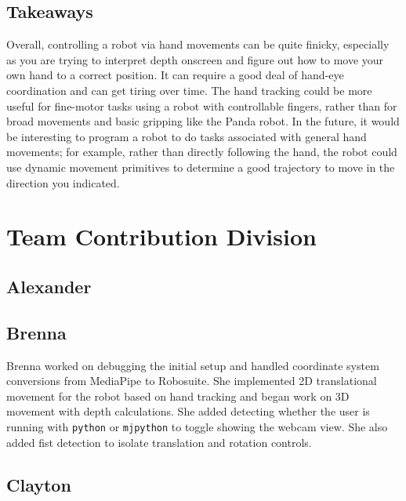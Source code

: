\documentclass{article}
\begin{document}
\subsection{Takeaways}Overall, controlling a robot via hand movements can be quite finicky, especially as you are trying to interpret depth onscreen and figure out how to move your own hand to a correct position. It can require a good deal of hand-eye coordination and can get tiring over time. The hand tracking could be more useful for fine-motor tasks using a robot with controllable fingers, rather than for broad movements and basic gripping like the Panda robot. In the future, it would be interesting to program a robot to do tasks associated with general hand movements; for example, rather than directly following the hand, the robot could use dynamic movement primitives to determine a good trajectory to move in the direction you indicated. 


\section{Team Contribution Division}
\subsection*{Alexander}
\subsection*{Brenna}
Brenna worked on debugging the initial setup and handled coordinate system conversions from MediaPipe to Robosuite. She implemented 2D translational movement for the robot based on hand tracking and began work on 3D movement with depth calculations. She added detecting whether the user is running with \texttt{python} or \texttt{mjpython} to toggle showing the webcam view. She also added fist detection to isolate translation and rotation controls. 
\subsection*{Clayton}


\clearpage


\end{document}
